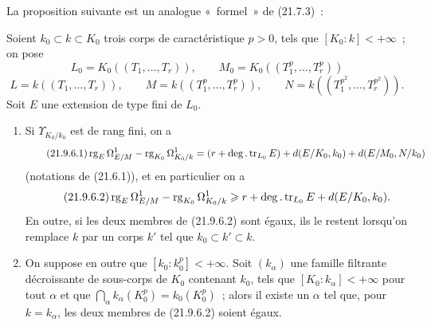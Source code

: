 La proposition suivante est un analogue «~formel~» de (21.7.3)~:

\begin{proposition}[21.9.6]
\label{0.21.9.6-fr}
Soient $k_0\subset k\subset K_0$ trois corps de caractéristique $p>0$, tels
que $[K_0:k]<+\infty$~; on pose
\[
  L_0=K_0((T_1,\ldots,T_r)),\qquad
  M_0=K_0((T_1^p,\ldots,T_r^p))
\]
\[
  L=k((T_1,\ldots,T_r)),\qquad
  M=k((T_1^p,\ldots,T_r^p)),\qquad
  N=k((T_1^{p^2},\ldots,T_r^{p^2})).
\]
Soit $E$ une extension de type fini de $L_0$.
\begin{enumerate}
  \item[\textup{(i)}] Si $\Upsilon_{K_0/k_0}$ est de rang fini, on a
  \begin{equation}
  \tag{21.9.6.1}
  \label{0.21.9.6.1-fr}
    \operatorname{rg}_E\Omega^1_{E/M}
    -\operatorname{rg}_{K_0}\Omega^1_{K_0/k}
    =(r+\deg.\operatorname{tr}_{L_0}E)
      +d(E/K_0,k_0)+d(E/M_0,N/k_0)
  \end{equation}
  (notations de (21.6.1)), et en particulier on a
  \begin{equation}
  \tag{21.9.6.2}
  \label{0.21.9.6.2-fr}
    \operatorname{rg}_E\Omega^1_{E/M}
    -\operatorname{rg}_{K_0}\Omega^1_{K_0/k}
    \geqslant r+\deg.\operatorname{tr}_{L_0}E+d(E/K_0,k_0).
  \end{equation}
  En outre, si les deux membres de (21.9.6.2) sont égaux, ils le restent
  lorsqu'on remplace $k$ par un corps $k'$ tel que $k_0\subset k'\subset k$.

  \item[\textup{(ii)}] On suppose en outre que $[k_0:k_0^p]<+\infty$. Soit
  $(k_\alpha)$ une famille filtrante décroissante de sous-corps de $K_0$
  contenant $k_0$, tels que $[K_0:k_\alpha]<+\infty$ pour tout $\alpha$ et
  que
  $\bigcap_\alpha k_\alpha(K_0^p)=k_0(K_0^p)$~; alors il existe un $\alpha$
  tel que, pour $k=k_\alpha$, les deux membres de (21.9.6.2) soient égaux.
\end{enumerate}
\end{proposition}

